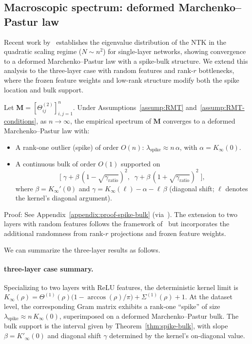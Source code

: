 \subsection{Macroscopic spectrum: deformed Marchenko–Pastur law}
Recent work by~\cite{benigni2025eigenvaluedistributionneuraltangent} establishes the eigenvalue distribution of the NTK in the quadratic scaling regime (\( N \sim n^2 \)) for single-layer networks, showing convergence to a deformed Marchenko–Pastur law with a spike-bulk structure. We extend this analysis to the three-layer case with random features and rank-\( r \) bottlenecks, where the frozen feature weights and low-rank structure modify both the spike location and bulk support.

\begin{theorem}\label{thm:spike-bulk}
Let \( \mathbf{M} = [\Theta^{(2)}_{ij}]_{i,j=1}^n \). Under Assumptions~\ref{assump:RMT} and~\ref{assump:RMT-conditions}, as \( n\to\infty \), the empirical spectrum of \( \mathbf{M} \) converges to a deformed Marchenko–Pastur law with:
\begin{itemize}
    \item A rank-one outlier (spike) of order \(O(n)\): \( \lambda_{\mathrm{spike}} \approx n\,\alpha \), with \( \alpha = K_{\infty}(0) \).
    \item A continuous bulk of order \(O(1)\) supported on
    \[
    \Big[\;\gamma + \beta\,(1-\sqrt{\gamma_{\mathrm{ratio}}})^2,\;\; \gamma + \beta\,(1+\sqrt{\gamma_{\mathrm{ratio}}})^2\;\Big],
    \]
    where \( \beta = K_{\infty}'(0) \) and \( \gamma = K_{\infty}(\ell) - \alpha - \ell\,\beta \) (diagonal shift; \(\ell\) denotes the kernel's diagonal argument).
\end{itemize}
Proof: See Appendix~\ref{appendix:proof-spike-bulk} (via~\cite{El_Karoui_2010}). The extension to two layers with random features follows the framework of~\cite{benigni2025eigenvaluedistributionneuraltangent} but incorporates the additional randomness from rank-\( r \) projections and frozen feature weights.
\end{theorem}

We can summarize the three-layer results as follows.

\paragraph{three-layer case summary.}
Specializing to two layers with ReLU features, the deterministic kernel limit is
\( K_{\infty}(\rho) = \Theta^{(1)}(\rho)\big(1-\arccos(\rho)/\pi\big) + \Sigma^{(1)}(\rho) + 1 \).
At the dataset level, the corresponding Gram matrix exhibits a rank-one ``spike'' of size
\( \lambda_{\mathrm{spike}} \approx n\,K_{\infty}(0) \), superimposed on a deformed Marchenko–Pastur bulk.
The bulk support is the interval given by Theorem~\ref{thm:spike-bulk}, with slope
\( \beta = K'_{\infty}(0) \) and diagonal shift \( \gamma \) determined by the kernel's on-diagonal value.
